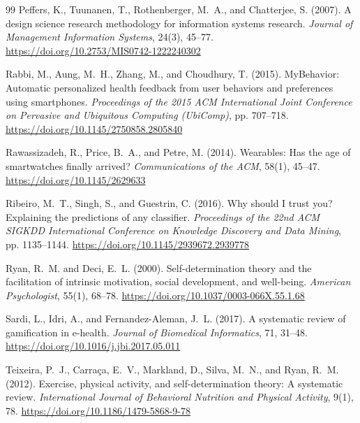 \documentclass[12pt, a4paper]{report}
\begin{document}
\begin{thebibliography}{99}
Peffers, K., Tuunanen, T., Rothenberger, M.~A., and Chatterjee, S. (2007).
A design science research methodology for information systems research.
\textit{Journal of Management Information Systems}, 24(3), 45--77.
\url{https://doi.org/10.2753/MIS0742-1222240302}

Rabbi, M., Aung, M.~H., Zhang, M., and Choudhury, T. (2015).
MyBehavior: Automatic personalized health feedback from user behaviors and preferences using smartphones.
\textit{Proceedings of the 2015 ACM International Joint Conference on Pervasive and Ubiquitous Computing (UbiComp)}, pp. 707--718.
\url{https://doi.org/10.1145/2750858.2805840}

Rawassizadeh, R., Price, B.~A., and Petre, M. (2014).
Wearables: Has the age of smartwatches finally arrived?
\textit{Communications of the ACM}, 58(1), 45--47.
\url{https://doi.org/10.1145/2629633}

Ribeiro, M.~T., Singh, S., and Guestrin, C. (2016).
Why should I trust you? Explaining the predictions of any classifier.
\textit{Proceedings of the 22nd ACM SIGKDD International Conference on Knowledge Discovery and Data Mining}, pp. 1135--1144.
\url{https://doi.org/10.1145/2939672.2939778}

Ryan, R.~M. and Deci, E.~L. (2000).
Self-determination theory and the facilitation of intrinsic motivation, social development, and well-being.
\textit{American Psychologist}, 55(1), 68--78.
\url{https://doi.org/10.1037/0003-066X.55.1.68}

Sardi, L., Idri, A., and Fernandez-Aleman, J.~L. (2017).
A systematic review of gamification in e-health.
\textit{Journal of Biomedical Informatics}, 71, 31--48.
\url{https://doi.org/10.1016/j.jbi.2017.05.011}

Teixeira, P.~J., Carraça, E.~V., Markland, D., Silva, M.~N., and Ryan, R.~M. (2012).
Exercise, physical activity, and self-determination theory: A systematic review.
\textit{International Journal of Behavioral Nutrition and Physical Activity}, 9(1), 78.
\url{https://doi.org/10.1186/1479-5868-9-78}

\end{thebibliography}
\end{document}
